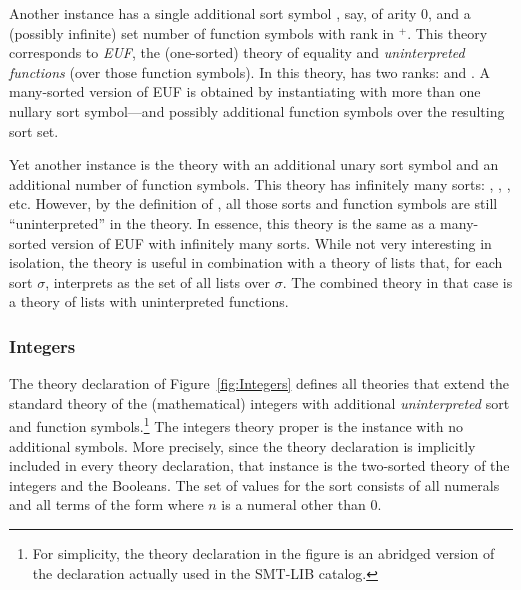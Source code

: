 Another instance has a single additional sort symbol , say, 
of arity 0, and a (possibly infinite) set number of function symbols 
with rank in $\!^+$.
This theory corresponds to \emph{EUF}, 
the (one-sorted) theory of equality and \emph{uninterpreted functions}
(over those function symbols).
In this theory,  has two ranks:
 and .
A many-sorted version of EUF is obtained by instantiating 
with more than one nullary sort symbol---and possibly additional
function symbols over the resulting sort set. 

Yet another instance is the theory with an additional unary sort symbol 
and an additional number of function symbols.
This theory has infinitely many sorts:
, ,  , etc.
However, by the definition of ,
all those sorts and function symbols are still ``uninterpreted'' in the theory.
In essence, 
this theory is the same as a many-sorted version of EUF with infinitely many sorts.
While not very interesting in isolation,
the theory is useful in combination with a theory of lists that,
for each sort $\sigma$, 
interprets  as the set of all lists over $\sigma$.
The combined theory in that case is a theory of lists with uninterpreted
functions.


\subsubsection*{Integers}

The theory declaration of Figure~\ref{fig:Integers} defines all theories
that extend the standard theory of the (mathematical) integers with additional 
\emph{uninterpreted} sort and function symbols.\footnote{%
For simplicity, the theory declaration in the figure is an abridged version of 
the declaration actually used in the SMT-LIB catalog.
}
The integers theory proper is the instance with no additional symbols.
More precisely,
since the  theory declaration is implicitly included in
every theory declaration,
that instance is the two-sorted theory of the integers and the Booleans.
The set of values for the  sort consists of all numerals and 
all terms of the form 
where $n$ is a numeral other than $0$.


